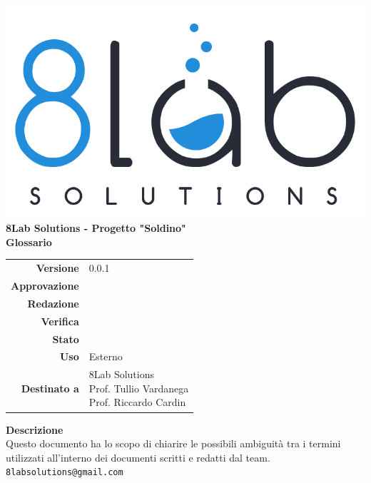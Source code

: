 \thispagestyle{empty}
\begin{titlepage}
	\begin{center}
		\includegraphics[scale = 0.3]{images/logo8_crop.png}\\
		\large \textbf{8Lab Solutions - Progetto "Soldino"} \\
		\vfill
		\Huge \textbf{Glossario}
		\vspace*{\fill} 
        \vfill
        \large
        \begin{tabular}{r|l}
                        \textbf{Versione} & 0.0.1\\
                        \textbf{Approvazione} &\\
                        \textbf{Redazione} &\\
                        \textbf{Verifica} &\\
                        \textbf{Stato} &\\
                        \textbf{Uso} & Esterno\\
                        \textbf{Destinato a} & \parbox[t]{5cm}{8Lab Solutions\\Prof. Tullio Vardanega\\Prof. Riccardo Cardin}
                \end{tabular}
                \vfill
                \normalsize
                \textbf{Descrizione}\\
                Questo documento ha lo scopo di chiarire le possibili ambiguità tra i termini utilizzati all’interno dei documenti scritti e redatti dal team.\\
                \vfill
                \small
                \texttt{8labsolutions@gmail.com}
	\end{center}
\end{titlepage}